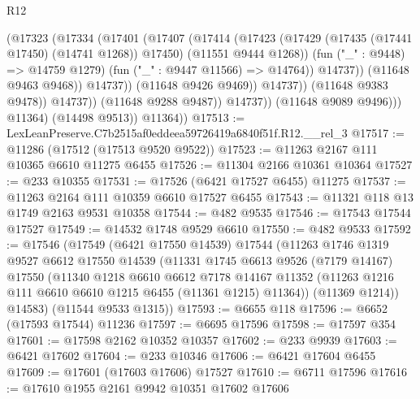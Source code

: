 \begin{lexlean}{R12}
\begin{coremodule}
                                    (@17323
                                      (@17334
                                        (@17401
                                          (@17407
                                            (@17414
                                              (@17423
                                                (@17429
                                                  (@17435 (@17441 @17450) (@14741 @1268))
                                                  @17450)
                                                (@11551 @9444 @1268))
                                              (fun ("_" : @9448) => @14759 @1279)
                                              (fun ("_" : @9447 @11566) => @14764))
                                            @14737))
                                        (@11648 @9463 @9468))
                                      @14737))
                                  (@11648 @9426 @9469))
                                @14737))
                            (@11648 @9383 @9478))
                          @14737))
                      (@11648 @9288 @9487))
                    @14737))
                (@11648 @9089 @9496)))
            @11364)
          (@14498 @9513))
        @11364))
@17513 := LexLeanPreserve.C7b2515af0eddeea59726419a6840f51f.R12.__rel_3
@17517 := @11286 (@17512 (@17513 @9520 @9522))
@17523 := @11263 @2167 @111 @10365 @6610 @11275 @6455
@17526 := @11304 @2166 @10361 @10364
@17527 := @233 @10355
@17531 := @17526 (@6421 @17527 @6455) @11275
@17537 := @11263 @2164 @111 @10359 @6610 @17527 @6455
@17543 := @11321 @118 @13 @1749 @2163 @9531 @10358
@17544 := @482 @9535
@17546 := @17543 @17544 @17527
@17549 := @14532 @1748 @9529 @6610
@17550 := @482 @9533
@17592 := @17546
    (@17549
      (@6421 @17550 @14539)
      @17544
      (@11263
        @1746
        @1319
        @9527
        @6612
        @17550
        @14539
        (@11331
          @1745
          @6613
          @9526
          (@7179 @14167)
          @17550
          (@11340
            @1218
            @6610
            @6612
            @7178
            @14167
            @11352
            (@11263 @1216 @111 @6610 @6610 @1215 @6455 (@11361 @1215) @11364))
          (@11369 @1214))
        @14583)
      (@11544 @9533 @1315))
@17593 := @6655 @118
@17596 := @6652 (@17593 @17544) @11236
@17597 := @6695 @17596
@17598 := @17597 @354
@17601 := @17598 @2162 @10352 @10357
@17602 := @233 @9939
@17603 := @6421 @17602
@17604 := @233 @10346
@17606 := @6421 @17604 @6455
@17609 := @17601 (@17603 @17606) @17527
@17610 := @6711 @17596
@17616 := @17610 @1955 @2161 @9942 @10351 @17602 @17606

\end{coremodule}
\end{lexlean}
